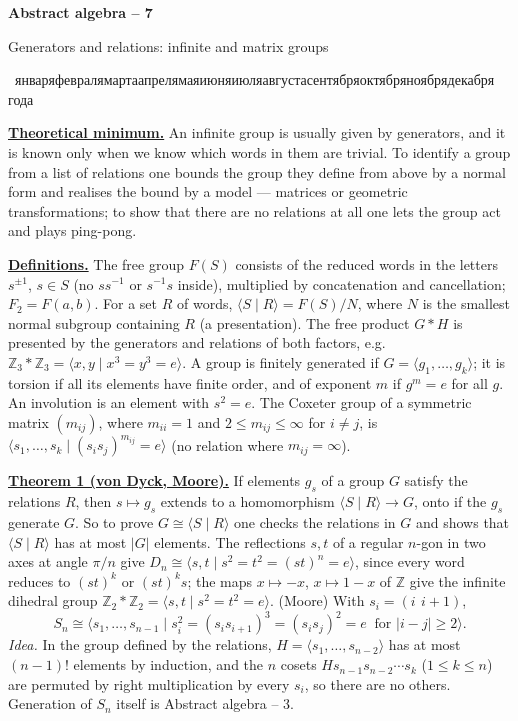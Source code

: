 \documentclass[11pt,a4paper]{article}
\newcommand{\head}[1]{\par\medskip\noindent\textbf{\underline{#1}}\quad}
\newcommand{\rudate}{\number\day~\ifcase\month\or января\or февраля\or марта\or апреля\or мая\or июня\or июля\or августа\or сентября\or октября\or ноября\or декабря\fi~\number\year~года}
\newcommand{\sheettitle}[3]{%
  \begin{center}
  {\huge\bfseries #1\par}\vspace{1.2em}
  {\Large #2\par}\vspace{0.8em}
  \if\relax\detokenize{#3}\relax\else{\Large #3\par}\vspace{0.8em}\fi
  {\foreignlanguage{russian}{\rudate}\par}
  \end{center}\vspace{0.5em}}
\newcommand{\Z}{\mathbb Z}
\begin{document}
\sheettitle{Abstract algebra -- 7}{Generators and relations: infinite and matrix groups}{}

\head{Theoretical minimum.} An infinite group is usually given by generators, and it is known
only when we know which words in them are trivial. To identify a group from a list of
relations one bounds the group they define from above by a normal form and realises the bound
by a model --- matrices or geometric transformations; to show that there are no relations
at all one lets the group act and plays ping-pong.

\head{Definitions.} The free group $F(S)$ consists of the reduced words in the letters
$s^{\pm1}$, $s\in S$ (no $ss^{-1}$ or $s^{-1}s$ inside), multiplied by concatenation and
cancellation; $F_2=F(a,b)$. For a set $R$ of words, $\langle S\mid R\rangle=F(S)/N$, where $N$
is the smallest normal subgroup containing $R$ (a presentation). The free product $G*H$ is
presented by the generators and relations of both factors, e.g.
$\Z_3*\Z_3=\langle x,y\mid x^3=y^3=e\rangle$. A group is finitely generated if
$G=\langle g_1,\dots,g_k\rangle$; it is torsion if all its elements have finite order, and of
exponent $m$ if $g^m=e$ for all $g$. An involution is an element with $s^2=e$. The Coxeter group
of a symmetric matrix $(m_{ij})$, where $m_{ii}=1$ and $2\leqslant m_{ij}\leqslant\infty$ for
$i\neq j$, is $\langle s_1,\dots,s_k\mid (s_is_j)^{m_{ij}}=e\rangle$ (no relation where
$m_{ij}=\infty$).

\head{Theorem 1 (von Dyck, Moore).} If elements $g_s$ of a group $G$
satisfy the relations $R$, then $s\mapsto g_s$ extends to a homomorphism
$\langle S\mid R\rangle\to G$, onto if the $g_s$ generate $G$. So to prove
$G\cong\langle S\mid R\rangle$ one checks the relations in $G$ and shows that
$\langle S\mid R\rangle$ has at most $|G|$ elements. The reflections $s,t$ of a regular
$n$-gon in two axes at angle $\pi/n$ give $D_n\cong\langle s,t\mid s^2=t^2=(st)^n=e\rangle$,
since every word reduces to $(st)^k$ or $(st)^ks$; the maps $x\mapsto-x$, $x\mapsto1-x$ of $\Z$
give the infinite dihedral group $\Z_2*\Z_2=\langle s,t\mid s^2=t^2=e\rangle$.
(Moore) With $s_i=(i\ \,i{+}1)$,
\[
S_n\cong\langle s_1,\dots,s_{n-1}\mid s_i^2=(s_is_{i+1})^3=(s_is_j)^2=e\ \text{ for } |i-j|\geqslant2\rangle .
\]
\emph{Idea.} In the group defined by the relations, $H=\langle s_1,\dots,s_{n-2}\rangle$ has at
most $(n-1)!$ elements by induction, and the $n$ cosets $Hs_{n-1}s_{n-2}\cdots s_k$
($1\leqslant k\leqslant n$) are permuted by right multiplication by every $s_i$, so there are no
others. Generation of $S_n$ itself is Abstract algebra -- 3.
\end{document}
